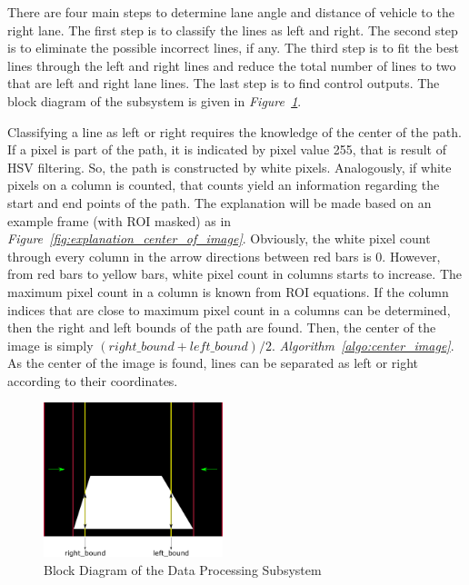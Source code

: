 \documentclass[a4paper,12pt]{article}
\begin{document}
\begin{enumerate}[A.]
There are four main steps to determine lane angle and distance of vehicle to the right lane. The first step is to classify the lines as left and right. The second step is to eliminate the possible incorrect lines, if any. The third step is to fit the best lines through the left and right lines and reduce the total number of lines to two that are left and right lane lines. The last step is to find control outputs. The block diagram of the subsystem is given in \textit{Figure~\ref{fig:dataProcessing_subsystem}}.

Classifying a line as left or right requires the knowledge of the center of the path. If a pixel is part of the path, it is indicated by pixel value 255, that is result of HSV filtering. So, the path is constructed by white pixels. Analogously, if white pixels on a column is counted, that counts yield an information regarding the start and end points of the path. The explanation will be made based on an example frame (with ROI masked) as in \textit{Figure~\ref{fig:explanation_center_of_image}}. Obviously, the white pixel count through every column in the arrow directions between red bars is 0. However, from red bars to yellow bars, white pixel count in columns starts to increase. The maximum pixel count in a column is known from ROI equations. If the column indices that are close to maximum pixel count in a columns can be determined, then the right and left bounds of the path are found. Then, the center of the image is simply $(right\_bound + left\_bound)/2$. \textit{Algorithm~\ref{algo:center_image}}. As the center of the image is found, lines can be separated as left or right according to their coordinates.

\begin{figure}[h]
	
	\includegraphics[width=0.465\textwidth,center]{images/ROT_ROI/explanation_center_of_image}
	
	\caption{Block Diagram of the Data Processing Subsystem}\label{fig:dataProcessing_subsystem}
	

\end{figure}
\end{enumerate}
\end{document}
